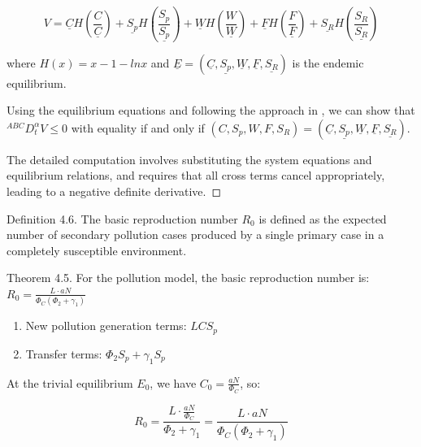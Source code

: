 \documentclass[10pt]{NSP1}
\begin{document}
\[
V = \underline{C}H\left( \frac{C}{\underline{C}} \right) + \underline{S_{p}}H\left( \frac{S_{p}}{\underline{S_{p}}} \right) + \underline{W}H\left( \frac{W}{\underline{W}} \right) + \underline{F}H\left( \frac{F}{\underline{F}} \right) + \underline{S_{R}}H\left( \frac{S_{R}}{\underline{S_{R}}} \right)
\]

where \(H(x) = x - 1 - lnx\) and \(\underline{E} = \left( \underline{C},\underline{S_{p}},\underline{W},\underline{F},\underline{S_{R}} \right)\) is the endemic equilibrium.

Using the equilibrium equations and following the approach in , we can show that \(^{ABC}D_{t}^{\alpha}V \leq 0\) with equality if and only if \(\left( C,S_{p},W,F,S_{R} \right) = \left( \underline{C},\underline{S_{p}},\underline{W},\underline{F},\underline{S_{R}} \right)\).

The detailed computation involves substituting the system equations and equilibrium relations, and requires that all cross terms cancel appropriately, leading to a negative definite derivative. ◻

\par\medskip{}\smallskip

Definition 4.6.\cite{ref5} The basic reproduction number \(R_{0}\) is defined as the expected number of secondary pollution cases produced by a single primary case in a completely susceptible environment.

Theorem 4.5. For the pollution model, the basic reproduction number is: \(R_{0} = \frac{L \cdot aN}{\Phi_{C}\left( \Phi_{2} + \gamma_{1} \right)}\)

\par\medskip{}\smallskip

\begin{enumerate}
  \item New pollution generation terms: \(LCS_{p}\)
  \item Transfer terms: \(\Phi_{2}S_{p} + \gamma_{1}S_{p}\)
\end{enumerate}

At the trivial equilibrium \(E_{0}\), we have \(C_{0} = \frac{aN}{\Phi_{C}}\), so:

\[
R_{0} = \frac{L \cdot \frac{aN}{\Phi_{C}}}{\Phi_{2} + \gamma_{1}} = \frac{L \cdot aN}{\Phi_{C}\left( \Phi_{2} + \gamma_{1} \right)}
\]
\end{document}
